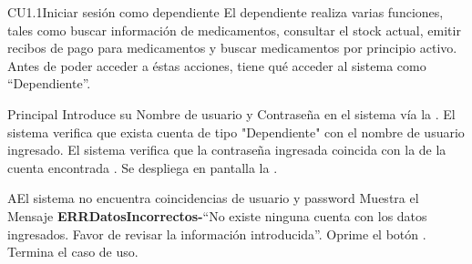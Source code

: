 
% 



	\begin{UseCase}{CU1.1}{Iniciar sesión como dependiente}{
		El dependiente realiza varias funciones, tales como buscar informaci\'on de medicamentos, consultar el stock actual, emitir recibos de pago para medicamentos y buscar medicamentos por principio activo. Antes de poder acceder a \'estas acciones, tiene qu\'e acceder al sistema como "`Dependiente"'.
	}
	\end{UseCase}

	\begin{UCtrayectoria}{Principal}
		\UCpaso[\UCactor] Introduce su Nombre de usuario y Contraseña en el sistema vía la  \label{CU1_1Login}.
		\UCpaso El sistema verifica que exista cuenta de tipo "Dependiente" con el nombre de usuario ingresado.
		\UCpaso El sistema verifica que la contraseña ingresada coincida con la de la cuenta encontrada .
		\UCpaso Se despliega en pantalla la .	
	\end{UCtrayectoria}
		
		\begin{UCtrayectoriaA}{A}{El sistema no encuentra coincidencias de usuario y password}
			\UCpaso Muestra el Mensaje {\bf ERRDatosIncorrectos-}``No existe ninguna cuenta con los datos ingresados. Favor de revisar la informaci\'on introducida''.
			\UCpaso[\UCactor] Oprime el botón .
			\UCpaso[] Termina el caso de uso.
		\end{UCtrayectoriaA}
		
		
